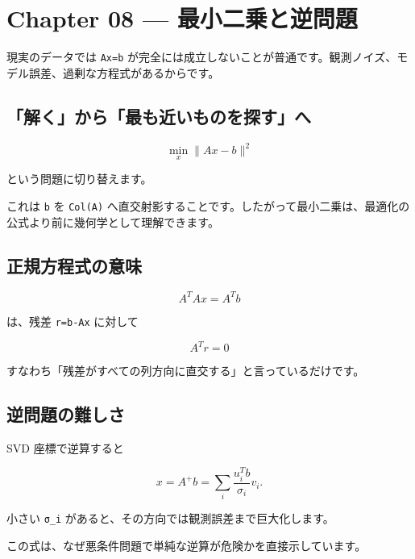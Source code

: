 \documentclass[
  11pt,
  a4paper,
]{ltjsarticle}
\author{}
\date{}
\begin{document}
\hypertarget{chapter-08-ux6700ux5c0fux4e8cux4e57ux3068ux9006ux554fux984c}{%
\section{Chapter 08 ---
最小二乗と逆問題}\label{chapter-08-ux6700ux5c0fux4e8cux4e57ux3068ux9006ux554fux984c}}

現実のデータでは \texttt{Ax=b}
が完全には成立しないことが普通です。観測ノイズ、モデル誤差、過剰な方程式があるからです。

\hypertarget{ux89e3ux304fux304bux3089ux6700ux3082ux8fd1ux3044ux3082ux306eux3092ux63a2ux3059ux3078}{%
\subsection{「解く」から「最も近いものを探す」へ}\label{ux89e3ux304fux304bux3089ux6700ux3082ux8fd1ux3044ux3082ux306eux3092ux63a2ux3059ux3078}}

\[
\min_x\|Ax-b\|^2
\]

という問題に切り替えます。

これは \texttt{b} を \texttt{Col(A)}
へ直交射影することです。したがって最小二乗は、最適化の公式より前に幾何学として理解できます。

\hypertarget{ux6b63ux898fux65b9ux7a0bux5f0fux306eux610fux5473}{%
\subsection{正規方程式の意味}\label{ux6b63ux898fux65b9ux7a0bux5f0fux306eux610fux5473}}

\[
A^TAx=A^Tb
\]

は、残差 \texttt{r=b-Ax} に対して

\[
A^Tr=0
\]

すなわち「残差がすべての列方向に直交する」と言っているだけです。

\hypertarget{ux9006ux554fux984cux306eux96e3ux3057ux3055}{%
\subsection{逆問題の難しさ}\label{ux9006ux554fux984cux306eux96e3ux3057ux3055}}

SVD 座標で逆算すると

\[
x=A^+b=\sum_i\frac{u_i^Tb}{\sigma_i}v_i.
\]

小さい \texttt{σ\_i} があると、その方向では観測誤差まで巨大化します。

この式は、なぜ悪条件問題で単純な逆算が危険かを直接示しています。
\end{document}
